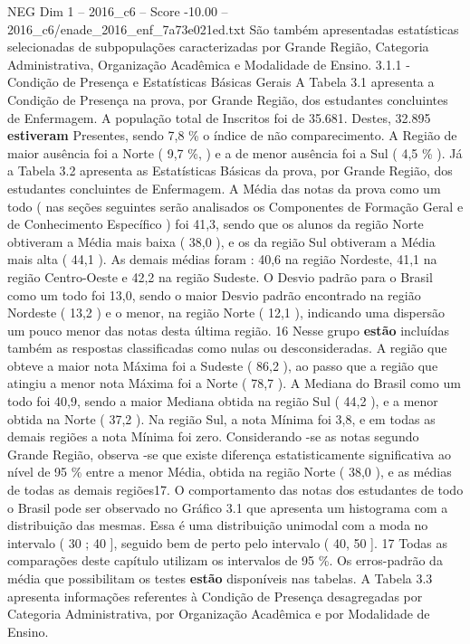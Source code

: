 \begin{textsample}{NEG Dim 1 – 2016\_c6 – Score -10.00 – 2016\_c6/enade\_2016\_enf\_7a73e021ed.txt}
São também apresentadas estatísticas selecionadas de subpopulações caracterizadas por Grande Região, Categoria Administrativa, Organização Acadêmica e Modalidade de Ensino. 3.1.1 - Condição de Presença e Estatísticas Básicas Gerais A Tabela 3.1 apresenta a Condição de Presença na prova, por Grande Região, dos estudantes concluintes de Enfermagem.
A população total de Inscritos foi de 35.681.
Destes, 32.895 \textbf{estiveram} Presentes, sendo 7,8 \% o índice de não comparecimento.
A Região de maior ausência foi a Norte ( 9,7 \%, ) e a de menor ausência foi a Sul ( 4,5 \% ).
Já a Tabela 3.2 apresenta as Estatísticas Básicas da prova, por Grande Região, dos estudantes concluintes de Enfermagem.
A Média das notas da prova como um todo ( nas seções seguintes serão analisados os Componentes de Formação Geral e de Conhecimento Específico ) foi 41,3, sendo que os alunos da região Norte obtiveram a Média mais baixa ( 38,0 ), e os da região Sul obtiveram a Média mais alta ( 44,1 ).
As demais médias foram : 40,6 na região Nordeste, 41,1 na região Centro-Oeste e 42,2 na região Sudeste.
O Desvio padrão para o Brasil como um todo foi 13,0, sendo o maior Desvio padrão encontrado na região Nordeste ( 13,2 ) e o menor, na região Norte ( 12,1 ), indicando uma dispersão um pouco menor das notas desta última região. 16 Nesse grupo \textbf{estão} incluídas também as respostas classificadas como nulas ou desconsideradas.
A região que obteve a maior nota Máxima foi a Sudeste ( 86,2 ), ao passo que a região que atingiu a menor nota Máxima foi a Norte ( 78,7 ).
A Mediana do Brasil como um todo foi 40,9, sendo a maior Mediana obtida na região Sul ( 44,2 ), e a menor obtida na Norte ( 37,2 ).
Na região Sul, a nota Mínima foi 3,8, e em todas as demais regiões a nota Mínima foi zero.
Considerando -se as notas segundo Grande Região, observa -se que existe diferença estatisticamente significativa ao nível de 95 \% entre a menor Média, obtida na região Norte ( 38,0 ), e as médias de todas as demais regiões17.
O comportamento das notas dos estudantes de todo o Brasil pode ser observado no Gráfico 3.1 que apresenta um histograma com a distribuição das mesmas.
Essa é uma distribuição unimodal com a moda no intervalo ( 30 ; 40 ], seguido bem de perto pelo intervalo ( 40, 50 ]. 17 Todas as comparações deste capítulo utilizam os intervalos de 95 \%.
Os erros-padrão da média que possibilitam os testes \textbf{estão} disponíveis nas tabelas.
A Tabela 3.3 apresenta informações referentes à Condição de Presença desagregadas por Categoria Administrativa, por Organização Acadêmica e por Modalidade de Ensino.

\end{textsample}
